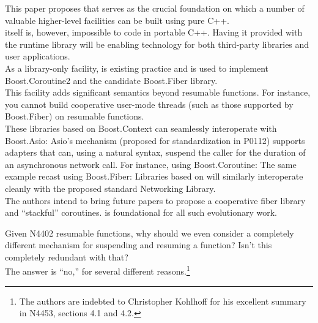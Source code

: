 This paper proposes \ectx that serves as the crucial foundation on which a
number of valuable higher-level facilities can be built using pure C++.\\
\newline
\ectx itself is, however, impossible to code in portable C++. Having it provided
with the runtime library will be enabling technology for both third-party
libraries and user applications.\\
\newline
As a library-only facility,
\cite{bcontext} is existing practice
and is used to implement Boost.Coroutine2\cite{bcoroutine2} and the candidate
Boost.Fiber library\cite{bfiber}.\\
\newline
This facility adds significant semantics beyond resumable functions. For
instance, you cannot build cooperative user-mode threads (such as those
supported by Boost.Fiber) on resumable functions.\\
\newline
These libraries based on Boost.Context can seamlessly interoperate with
Boost.Asio\cite{basio}: Asio's  mechanism (proposed for
standardization in P0112\cite{P0112}) supports adapters that can, using a
natural syntax, suspend the caller for the duration of an asynchronous network
call. For instance, using Boost.Coroutine:
The same example recast using Boost.Fiber:
Libraries based on \ectx will similarly interoperate cleanly with the proposed
standard Networking Library\cite{P0112}.\\
\newline
The authors intend to bring future papers to propose a cooperative fiber
library and ``stackful'' coroutines. \ectx is foundational for all such
evolutionary work.

Given N4402 resumable functions, why should we even consider a completely
different mechanism for suspending and resuming a function? Isn't this
completely redundant with that?\\
\newline
The answer is ``no,'' for several different reasons.\footnote{The authors are
indebted to Christopher Kohlhoff for his excellent summary in
N4453,\cite{N4453} sections 4.1 and 4.2.}

